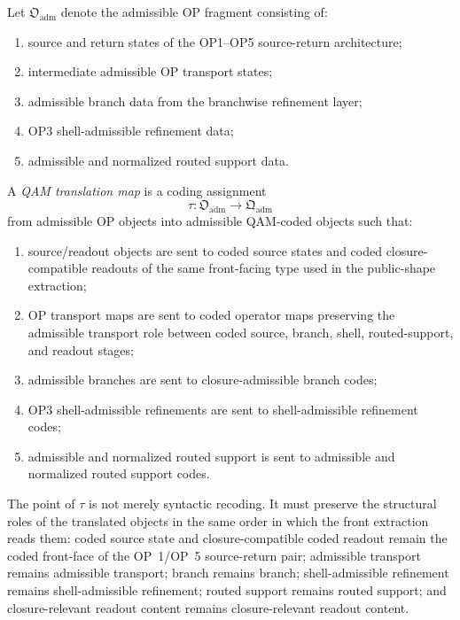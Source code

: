\begin{definition}
Let $\mathfrak{O}_{\mathrm{adm}}$ denote the admissible OP fragment consisting of:
\begin{enumerate}
\item source and return states of the OP1--OP5 source-return architecture;
\item intermediate admissible OP transport states;
\item admissible branch data from the branchwise refinement layer;
\item OP3 shell-admissible refinement data;
\item admissible and normalized routed support data.
\end{enumerate}
A \emph{QAM translation map} is a coding assignment
\[
\tau:\mathfrak{O}_{\mathrm{adm}}\to \mathfrak{Q}_{\mathrm{adm}}
\]
from admissible OP objects into admissible QAM-coded objects such that:
\begin{enumerate}
\item source/readout objects are sent to coded source states and coded closure-compatible readouts of the same front-facing type used in the public-shape extraction;
\item OP transport maps are sent to coded operator maps preserving the admissible transport role between coded source, branch, shell, routed-support, and readout stages;
\item admissible branches are sent to closure-admissible branch codes;
\item OP3 shell-admissible refinements are sent to shell-admissible refinement codes;
\item admissible and normalized routed support is sent to admissible and normalized routed support codes.
\end{enumerate}
\end{definition}

\begin{remark}
The point of $\tau$ is not merely syntactic recoding. It must preserve the structural roles of the translated objects in the same order in which the front extraction reads them: coded source state and closure-compatible coded readout remain the coded front-face of the OP~1/OP~5 source-return pair; admissible transport remains admissible transport; branch remains branch; shell-admissible refinement remains shell-admissible refinement; routed support remains routed support; and closure-relevant readout content remains closure-relevant readout content.
\end{remark}

